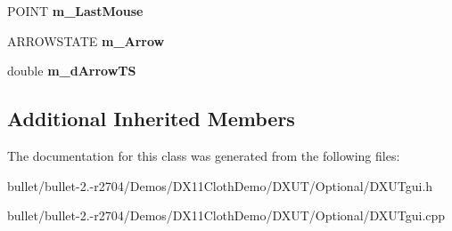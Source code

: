 \begin{DoxyCompactItemize}
\item 
\hypertarget{class_c_d_x_u_t_scroll_bar_a1cde93aff0ec2547c01db9afcc508782}{P\+O\+I\+N\+T {\bfseries m\+\_\+\+Last\+Mouse}}\label{class_c_d_x_u_t_scroll_bar_a1cde93aff0ec2547c01db9afcc508782}

\item 
\hypertarget{class_c_d_x_u_t_scroll_bar_a909a6087207d8187daacf84356fefbe8}{A\+R\+R\+O\+W\+S\+T\+A\+T\+E {\bfseries m\+\_\+\+Arrow}}\label{class_c_d_x_u_t_scroll_bar_a909a6087207d8187daacf84356fefbe8}

\item 
\hypertarget{class_c_d_x_u_t_scroll_bar_a0e16cf4d357346864321f471afa456cd}{double {\bfseries m\+\_\+d\+Arrow\+T\+S}}\label{class_c_d_x_u_t_scroll_bar_a0e16cf4d357346864321f471afa456cd}

\end{DoxyCompactItemize}
\subsection*{Additional Inherited Members}


The documentation for this class was generated from the following files\+:\begin{DoxyCompactItemize}
\item 
bullet/bullet-\/2.-\/r2704/\+Demos/\+D\+X11\+Cloth\+Demo/\+D\+X\+U\+T/\+Optional/D\+X\+U\+Tgui.\+h\item 
bullet/bullet-\/2.-\/r2704/\+Demos/\+D\+X11\+Cloth\+Demo/\+D\+X\+U\+T/\+Optional/D\+X\+U\+Tgui.\+cpp\end{DoxyCompactItemize}
